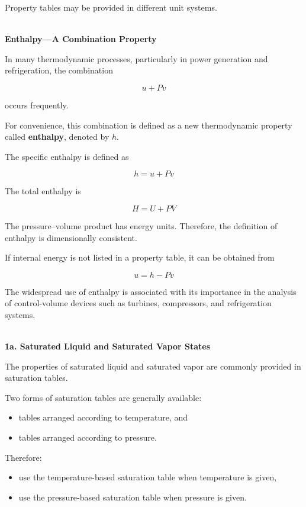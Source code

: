 \documentclass[12pt]{article}
\begin{document}
Property tables may be provided in different unit systems.

\textbf{\\ Enthalpy---A Combination Property}

In many thermodynamic processes, particularly in power generation and refrigeration, the combination

\begin{equation*}
u+Pv
\end{equation*}

occurs frequently.

For convenience, this combination is defined as a new thermodynamic property called \textbf{enthalpy}, denoted by $h$.

The specific enthalpy is defined as

\begin{equation*}
\boxed{h=u+Pv}
\end{equation*}

The total enthalpy is

\begin{equation*}
\boxed{H=U+PV}
\end{equation*}


The pressure--volume product has energy units. Therefore, the definition of enthalpy is dimensionally consistent.

If internal energy is not listed in a property table, it can be obtained from

\begin{equation*}
\boxed{u=h-Pv}
\end{equation*}

The widespread use of enthalpy is associated with its importance in the analysis of control-volume devices such as turbines, compressors, and refrigeration systems.

\textbf{\\ 1a. Saturated Liquid and Saturated Vapor States}

The properties of saturated liquid and saturated vapor are commonly provided in saturation tables.

Two forms of saturation tables are generally available:
\begin{itemize}
    \item tables arranged according to temperature, and
    \item tables arranged according to pressure.
\end{itemize}

Therefore:
\begin{itemize}
    \item use the temperature-based saturation table when temperature is given,
    \item use the pressure-based saturation table when pressure is given.
\end{itemize}
\end{document}

